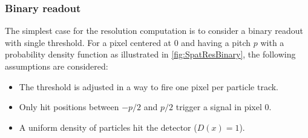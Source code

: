       






\subsubsection{Binary readout} \label{sec:binaryReadout}
The simplest case for the resolution computation is to consider a
binary readout with single threshold. For a pixel centered at 0 and
having a pitch $p$ with a probability density function as illustrated
in \cref{fig:SpatResBinary}, the following assumptions are considered:

\begin{itemize}
\item The threshold is adjusted in a way to fire one pixel per
  particle track.
\item Only hit positions between $-p/2$ and $p/2$ trigger a signal in
  pixel 0.
\item A uniform density of particles hit the detector ($D\left(x\right)=1$).
\end{itemize}


